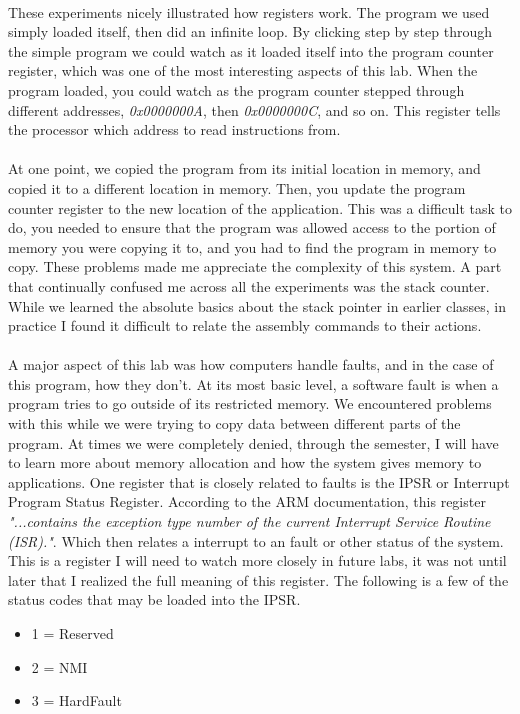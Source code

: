 \documentclass[12pt,a4paper,notitlepage]{report}
\begin{document}
\begin{normalsize}
	\paragraph*{}
	These experiments nicely illustrated how registers work. The program we used simply loaded itself, then did an infinite loop. By clicking step by step through the simple program we could watch as it loaded itself into the program counter register, which was one of the most interesting aspects of this lab. When the program loaded, you could watch as the program counter stepped through different addresses, \textit{0x0000000A}, then \textit{0x0000000C}, and so on. This register tells the processor which address to read instructions from. 
	\paragraph*{}
	At one point, we copied the program from its initial location in memory, and copied it to a different location in memory. Then, you update the program counter register to the new location of the application. This was a difficult task to do, you needed to ensure that the program was allowed access to the portion of memory you were copying it to, and you had to find the program in memory to copy. These problems made me appreciate the complexity of this system. A part that continually confused me across all the experiments was the stack counter. While we learned the absolute basics about the stack pointer in earlier classes, in practice I found it difficult to relate the assembly commands to their actions.
	\paragraph*{} 
	A major aspect of this lab was how computers handle faults, and in the case of this program, how they don't. At its most basic level, a software fault is when a program tries to go outside of its restricted memory. We encountered problems with this while we were trying to copy data between different parts of the program. At times we were completely denied, through the semester, I will have to learn more about memory allocation and how the system gives memory to applications. One register that is closely related to faults is the IPSR or Interrupt Program Status Register. According to the ARM documentation, this register \emph{"...contains the exception type number of the current Interrupt Service Routine (ISR)."}. Which then relates a interrupt to an fault or other status of the system. This is a register I will need to watch more closely in future labs, it was not until later that I realized the full meaning of this register. The following is a few of the status codes that may be loaded into the IPSR.
\begin{itemize}
  \item 1 = Reserved
  \item 2 = NMI
  \item 3 = HardFault
\end{itemize}


\end{normalsize}
\end{document}
